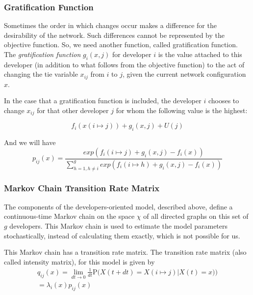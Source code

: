\documentclass[12pt,letterpaper]{gthesis2}  %
\begin{document}
\subsubsection*{Gratification Function}
Sometimes the order in which changes occur makes a difference for the desirability of the network. Such differences cannot be represented by the objective function. So, we need another function, called gratification function. \\

The \textit{gratification function} $g_i(x,j)$ for developer $i$ is the value attached to this developer (in addition to what follows from the objective function) to the act of changing the tie variable $x_{ij}$ from $i$ to $j$, given the current network configuration $x$. 

In the case that a gratification function is included, the developer $i$ chooses to change $x_{ij}$ for that other developer $j$ for whom the following value \cite{Snijders2004} is the highest:

\begin{equation}
f_i(x(i \mapsto j)) + g_i(x, j) + U(j)
\end{equation} 

And we will have 
\begin{equation}
\label{ObjectiveFunctionWithGratification}
p_{ij}(x) = \frac{exp(f_i(i \mapsto j) + g_i(x, j) - f_i(x))}{\sum_{h=1, h \neq i}^{g} exp(f_i(i \mapsto h) + g_i(x, j) - f_i(x))}
\end{equation}

\subsubsection*{Markov Chain Transition Rate Matrix}
The components of the developers-oriented model, described above, define a continuous-time Markov chain on the space $\chi$ of all directed graphs on this set of $g$ developers. This Markov chain is used to estimate the model parameters stochastically, instead of calculating them exactly, which is not possible for us.

This Markov chain has a transition rate matrix. The transition rate matrix (also called intensity matrix), for this model is given by 
\begin{multline}
\label{intensityMatrix}
q_{ij}(x) = \lim_{dt \to 0} \frac{1}{dt} \mathrm {P} \big({X(t + dt) = X(i \mapsto j) | X(t) = x)}\big) \\ = \lambda_i(x) p_{ij}(x)
\end{multline}
\end{document}
